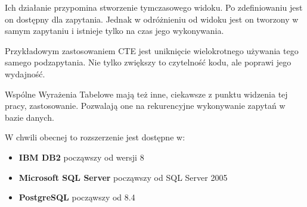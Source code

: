 Ich działanie przypomina stworzenie tymczasowego widoku. 
Po zdefiniowaniu jest on dostępny dla zapytania.
Jednak w odróżnieniu od widoku jest on tworzony w samym zapytaniu i istnieje tylko na czas jego wykonywania.


Przykładowym zastosowaniem CTE jest uniknięcie wielokrotnego używania tego samego podzapytania\cite{apress-sqlserver}.
Nie tylko zwiększy to czytelność kodu, ale poprawi jego wydajność.




Wspólne Wyrażenia Tabelowe mają też inne, ciekawsze z punktu widzenia tej pracy, zastosowanie.
Pozwalają one na rekurencyjne wykonywanie zapytań w bazie danych.

W chwili obecnej to rozszerzenie jest dostępne w:
\begin{itemize}
 \item \textbf{IBM DB2} począwszy od  wersji 8
 \item \textbf{Microsoft SQL Server}
	począwszy od SQL Server 2005
 \item \textbf{PostgreSQL}
	począwszy od 8.4
\end{itemize}





